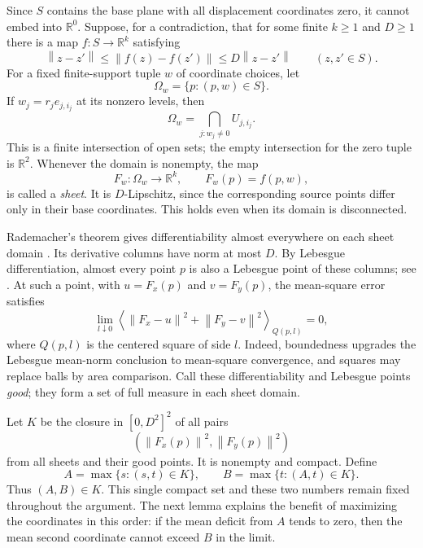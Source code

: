 \documentclass[11pt]{article}
\newcommand{\R}{\mathbb R}
\newcommand{\norm}[1]{\left\lVert#1\right\rVert}
\begin{document}
Since $S$ contains the base plane with all displacement coordinates zero, it cannot embed into $\R^0$. Suppose, for a contradiction, that for some finite $k\ge1$ and $D\ge1$ there is a map $f:S\to\R^k$ satisfying
\begin{equation}\label{eq:bilip}
 \norm{z-z'}\le\norm{f(z)-f(z')}\le D\norm{z-z'}
 \qquad(z,z'\in S).
\end{equation}
For a fixed finite-support tuple $w$ of coordinate choices, let
\[
 \Omega_w=\{p:(p,w)\in S\}.
\]
If $w_j=r_je_{j,i_j}$ at its nonzero levels, then
\[
 \Omega_w=\bigcap_{j:w_j\ne0}U_{j,i_j}.
\]
This is a finite intersection of open sets; the empty intersection for the zero tuple is $\R^2$. Whenever the domain is nonempty, the map
\[
 F_w:\Omega_w\to\R^k,\qquad F_w(p)=f(p,w),
\]
is called a \emph{sheet}. It is $D$-Lipschitz, since the corresponding source points differ only in their base coordinates. This holds even when its domain is disconnected.

Rademacher's theorem gives differentiability almost everywhere on each sheet domain \cite[Theorem 3.1]{Heinonen}. Its derivative columns have norm at most $D$. By Lebesgue differentiation, almost every point $p$ is also a Lebesgue point of these columns; see \cite[Theorem 32 and Exercise 33]{Tao}. At such a point, with $u=F_x(p)$ and $v=F_y(p)$, the mean-square error satisfies
\begin{equation}\label{eq:good}
 \lim_{l\downarrow0}\left\langle\norm{F_x-u}^2+\norm{F_y-v}^2\right\rangle_{Q(p,l)}=0,
\end{equation}
where $Q(p,l)$ is the centered square of side $l$. Indeed, boundedness upgrades the Lebesgue mean-norm conclusion to mean-square convergence, and squares may replace balls by area comparison. Call these differentiability and Lebesgue points \emph{good}; they form a set of full measure in each sheet domain.

Let $K$ be the closure in $[0,D^2]^2$ of all pairs
\[
 (\norm{F_x(p)}^2,\norm{F_y(p)}^2)
\]
from all sheets and their good points. It is nonempty and compact. Define
\begin{equation}\label{eq:AB}
 A=\max\{s:(s,t)\in K\},\qquad
 B=\max\{t:(A,t)\in K\}.
\end{equation}
Thus $(A,B)\in K$. This single compact set and these two numbers remain fixed throughout the argument. The next lemma explains the benefit of maximizing the coordinates in this order: if the mean deficit from $A$ tends to zero, then the mean second coordinate cannot exceed $B$ in the limit.
\end{document}
